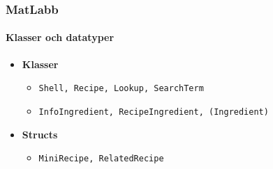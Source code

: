 \begin{frame}
  \frametitle{MatLabb}
  \framesubtitle{Klasser och datatyper}
  \begin{itemize}
    \item \textbf{Klasser}
      \begin{itemize}
        \item \texttt{Shell, Recipe, Lookup, SearchTerm}
        \item \texttt{InfoIngredient, RecipeIngredient, (Ingredient)}
      \end{itemize}
    \item \textbf{Structs}
      \begin{itemize}
        \item \texttt{MiniRecipe, RelatedRecipe}
      \end{itemize}
  \end{itemize}
\end{frame}
